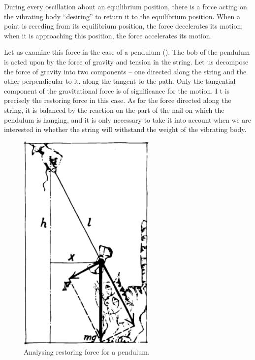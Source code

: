 During every oscillation about an equilibrium position,
there is a force acting on the vibrating body ``desiring''
to return it to the equilibrium position. When a point
is receding from its equilibrium position, the force
decelerates its motion; when it is approaching this position, the force accelerates its motion.

Let us examine this force in the case of a pendulum
(). The bob of the pendulum is acted upon by
the force of gravity and tension in the string. Let us
decompose the force of gravity into two components --
one directed along the string and the other perpendicular
to it, along the tangent to the path. Only the tangential
component of the gravitational force is of significance for
the motion. I t is precisely the restoring force in this case.
As for the force directed along the string, it is balanced
by the reaction on the part of the nail on which the pendulum is hanging, and it is only necessary to take it
into account when we are interested in whether the string
will withstand the weight of the vibrating body.
\begin{figure}[!ht]
\centering
\includegraphics[width=0.6\textwidth]{figures/fig-04-05.pdf}
\caption{Analysing restoring force for a pendulum.}
\label{fig-4.05}
\end{figure}


